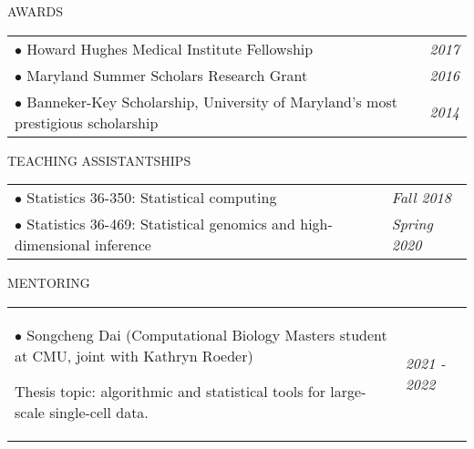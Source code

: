 \documentclass{resume} %
\begin{document}


\begin{rSection}{AWARDS}


\begin{tabular}{p{14cm}R{2.5cm}}
$\bullet$ Howard Hughes Medical Institute Fellowship  &  \it{2017}  \\ 
$\bullet$ Maryland Summer Scholars Research Grant  & \it{2016}  \\ 
$\bullet$ Banneker-Key Scholarship, University of Maryland's most prestigious scholarship & \it{2014}
\end{tabular} 


\end{rSection}



\begin{rSection}{TEACHING ASSISTANTSHIPS}
\begin{tabular}{p{14cm}R{2.5cm}}
	$\bullet$ Statistics 36-350: Statistical computing 
	& \textit{Fall 2018} \\ 
	$\bullet$ Statistics 36-469: Statistical genomics and high-dimensional inference & \textit{Spring 2020}
\end{tabular} 
\end{rSection}

\begin{rSection}{MENTORING}
	\begin{tabular}{p{14cm}R{2.5cm}}
		$\bullet$ Songcheng Dai (Computational Biology Masters student at CMU, joint with Kathryn Roeder)
		
		Thesis topic: algorithmic and statistical tools for large-scale single-cell data.
		& \textit{2021 - 2022} \\ 
	\end{tabular} 
\end{rSection}
\end{document}
